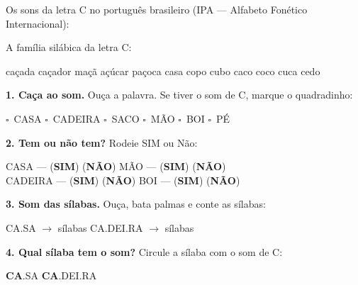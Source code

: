 
\begin{sonsdaletra}
Os sons da letra C no portugu\^es{} brasileiro (IPA --- Alfabeto Fon\'etico Internacional):

\end{sonsdaletra}


\begin{familiasilabica}
A fam\'ilia sil\'abica da letra C:

\begin{center}
ca\c{c}ada \quad ca\c{c}ador \quad ma\c{c}\~a \quad a\c{c}\'ucar \quad pa\c{c}oca \quad casa \quad copo \quad cubo \quad caco \quad coco \quad cuca \quad cedo
\end{center}
\end{familiasilabica}


\begin{somletra}
\textbf{1. Ca\c{c}a ao som.} Ou\c{c}a a palavra. Se tiver o som de C, marque o quadradinho:
\begin{center}
$\square$~CASA \quad $\square$~CADEIRA \quad $\square$~SACO \quad $\square$~M\~AO \quad $\square$~BOI \quad $\square$~P\'E
\end{center}

\textbf{2. Tem ou n\~ao{} tem?} Rodeie SIM ou N\~ao:
\begin{center}
CASA --- (\textbf{SIM}) (\textbf{N\~AO}) \quad M\~AO --- (\textbf{SIM}) (\textbf{N\~AO}) \\ CADEIRA --- (\textbf{SIM}) (\textbf{N\~AO}) \quad BOI --- (\textbf{SIM}) (\textbf{N\~AO})
\end{center}
\end{somletra}

\begin{somsilaba}
\textbf{3. Som das s\'ilabas.} Ou\c{c}a, bata palmas e conte as s\'ilabas:
\begin{center}
CA.SA $\rightarrow$ \underline{\hspace{1cm}} s\'ilabas \quad CA.DEI.RA $\rightarrow$ \underline{\hspace{1cm}} s\'ilabas
\end{center}

\textbf{4. Qual s\'ilaba tem o som?} Circule a s\'ilaba com o som de C:
\begin{center}
\textbf{CA}.SA \quad \textbf{CA}.DEI.RA
\end{center}
\end{somsilaba}


